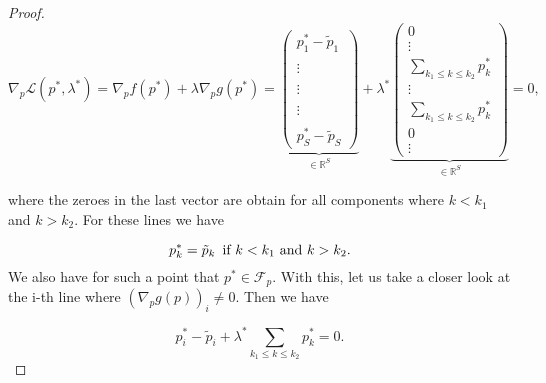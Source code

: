\begin{proof}
        \begin{equation}
            \nabla_{p} \mathcal{L}(p^{\ast}, \lambda^{\ast}) = \nabla_{p} f(p^{\ast}) + \lambda \nabla_{p} g(p^{\ast}) =
            \underbrace{\begin{pmatrix}
                p^{\ast}_{1} - \tilde{p}_{1} \\
                 \\
                \vdots \\
                 \\
                \vdots \\
                 \\
                \vdots \\
                 \\
                p^{\ast}_{S} - \tilde{p}_{S}
            \end{pmatrix}}_{\in \mathbb{R}^{S}}
            + \lambda^{\ast}
            \underbrace{\begin{pmatrix}
                0 \\
                \vdots \\
                \sum\limits_{k_{1} \le k \le k_{2}} p^{\ast}_{k} \\
                \vdots \\
                \sum\limits_{k_{1} \le k \le k_{2}} p^{\ast}_{k} \\
                0 \\
                \vdots
            \end{pmatrix}}_{\in \mathbb{R}^{S}}
            = 0,
        \end{equation}

        where the zeroes in the last vector are obtain for all components where $k < k_{1}$ and $k > k_{2}$. For these lines we have

            $$
                p^{\ast}_{k} = \tilde{p}_{k} \,\,\, \textnormal{if} \,\, k < k_{1} \,\, \textnormal{and} \,\, k > k_{2}.
            $$
        We also have for such a point that $p^{\ast} \in \mathcal{F}_{p}$. With this, let us take a closer look at the i-th line where $(\nabla_{p} g(p))_{i} \ne 0$. Then we have

            \begin{equation}
                p^{\ast}_{i} - \tilde{p}_{i} + \lambda^{\ast} \sum_{k_{1} \le k \le k_{2}} p^{\ast}_{k} = 0.
                \label{eq:ithRow}
            \end{equation}


\end{proof}
